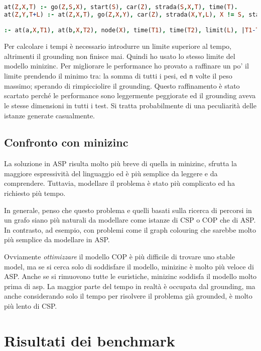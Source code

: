 \documentclass[11pt, a4paper]{article}
\begin{document}
\begin{lstlisting}[language=prolog]
at(Z,X,T) :- go(Z,S,X), start(S), car(Z), strada(S,X,T), time(T).
at(Z,Y,T+L) :- at(Z,X,T), go(Z,X,Y), car(Z), strada(X,Y,L), X != S, start(S), time(T), time(L).

:- at(a,X,T1), at(b,X,T2), node(X), time(T1), time(T2), limit(L), |T1-T2| <= L, x != S, start(S).
\end{lstlisting}

Per calcolare i tempi è necessario introdurre un limite superiore al tempo, altrimenti il grounding non finisce mai. Quindi ho usato lo stesso limite del modello minizinc.
Per migliorare le performance ho provato a raffinare un po' il limite prendendo il minimo tra: la somma di tutti i pesi, ed \lstinline{n} volte il peso massimo; sperando di rimpicciolire il grounding.
Questo raffinamento è stato scartato perché le performance sono leggermente peggiorate ed il grounding aveva le stesse dimensioni in tutti i test. Si tratta probabilmente di una peculiarità delle istanze generate casualmente.

\subsection{Confronto con minizinc}

La soluzione in ASP risulta molto più breve di quella in minizinc, sfrutta la maggiore espressività del linguaggio ed è più semplice da leggere e da comprendere.
Tuttavia, modellare il problema è stato più complicato ed ha richiesto più tempo.

In generale, penso che questo problema e quelli basati sulla ricerca di percorsi in un grafo siano più naturali da modellare come istanze di CSP o COP che di ASP.
In contrasto, ad esempio, con problemi come il graph colouring che sarebbe molto più semplice da modellare in ASP.

Ovviamente \emph{ottimizzare} il modello COP è più difficile di trovare uno stable model, ma se si cerca solo di soddisfare il modello, minizinc è molto più veloce di ASP.
Anche se si rimuovono tutte le euristiche, minizinc soddisfa il modello molto prima di asp.
La maggior parte del tempo in realtà è occupata dal grounding, ma anche considerando solo il tempo per risolvere il problema già grounded, è molto più lento di CSP.

\section{Risultati dei benchmark}


\end{document}
